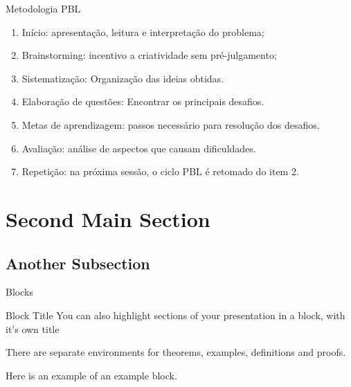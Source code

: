 \documentclass{beamer}
\begin{document}
\begin{frame}{Metodologia PBL}
  \begin{enumerate}
  \item {
    Início: apresentação, leitura e interpretação do problema;
    \pause %
  }
  \item {   
    Brainstorming: incentivo a criatividade sem pré-julgamento;
    \pause
  }
  \item {
    Sistematização: Organização das ideias obtidas.
    \pause
  }
  \item{
    Elaboração de questões: Encontrar os principais desafios.
    \pause
  }
  \item {
    Metas de aprendizagem: passos necessário para resolução dos desafios.
    \pause
  }
  \item{
    Avaliação: análise de aspectos que causam dificuldades.
    \pause
  }
  \item{
    Repetição: na próxima sessão, o ciclo PBL é retomado do item 2. 
  }
  \end{enumerate}
\end{frame}

\section{Second Main Section}

\subsection{Another Subsection}

\begin{frame}{Blocks}
\begin{block}{Block Title}
You can also highlight sections of your presentation in a block, with it's own title
\end{block}
\begin{theorem}
There are separate environments for theorems, examples, definitions and proofs.
\end{theorem}
\begin{example}
Here is an example of an example block.
\end{example}
\end{frame}

\end{document}
